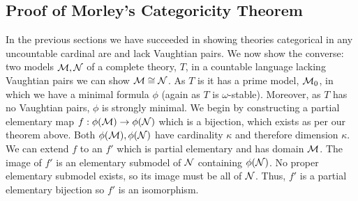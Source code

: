 
\subsection{Proof of Morley's Categoricity Theorem}

In the previous sections we have succeeded in showing theories categorical in any uncountable cardinal are \omst and lack Vaughtian pairs. 
We now show the converse: two models \(\mathcal{M}, \mathcal{N}\)  of a complete \omst theory, \(T\), in a countable language lacking Vaughtian pairs we can show \(\mathcal{M} \cong \mathcal{N}\). 
As \(T\) is \omst it has a prime model, \(\mathcal{M}_0\), in which we have a minimal formula \(\phi\) (again as \(T\) is \(\omega\)-stable).
Moreover, as \(T\) has no Vaughtian pairs, \(\phi\) is strongly minimal. 
We begin by constructing a partial elementary map \(f:\phi(\mathcal{M}) \to \phi(\mathcal{N})\) which is a bijection, which exists as per our theorem above.
Both \(\phi(\mathcal{M}), \phi(\mathcal{N})\) have cardinality \(\kappa\) and therefore dimension \(\kappa\). 
We can extend \(f\) to an \(f'\) which is partial elementary and has domain \(\mathcal{M}\). 
The image of \(f'\) is an elementary submodel of \(\mathcal{N}\) containing \(\phi(\mathcal{N})\). 
No proper elementary submodel exists, so its image must be all of \(\mathcal{N}\). 
Thus, \(f'\) is a partial elementary bijection 
so \(f'\) is an isomorphism.

